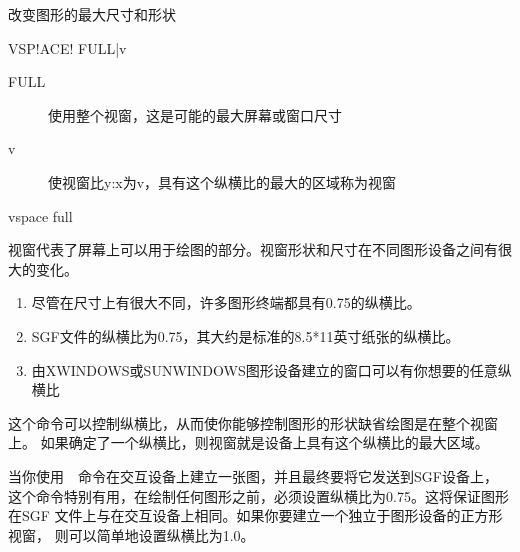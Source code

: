 \label{cmd:vspace}

改变图形的最大尺寸和形状

\begin{SACSTX}
VSP!ACE! FULL|v
\end{SACSTX}

\begin{description}
\item [FULL] 使用整个视窗，这是可能的最大屏幕或窗口尺寸
\item [v] 使视窗比y:x为v，具有这个纵横比的最大的区域称为视窗
\end{description}

\begin{SACDFT}
vspace full
\end{SACDFT}

视窗代表了屏幕上可以用于绘图的部分。视窗形状和尺寸在不同图形设备之间有很大的变化。
\begin{enumerate}
\item 尽管在尺寸上有很大不同，许多图形终端都具有0.75的纵横比。
\item SGF文件的纵横比为0.75，其大约是标准的8.5*11英寸纸张的纵横比。
\item  由XWINDOWS或SUNWINDOWS图形设备建立的窗口可以有你想要的任意纵横比
\end{enumerate}

这个命令可以控制纵横比，从而使你能够控制图形的形状缺省绘图是在整个视窗上。
如果确定了一个纵横比，则视窗就是设备上具有这个纵横比的最大区域。

当你使用~~命令在交互设备上建立一张图，并且最终要将它发送到SGF设备上，
这个命令特别有用，在绘制任何图形之前，必须设置纵横比为0.75。这将保证图形在SGF
文件上与在交互设备上相同。如果你要建立一个独立于图形设备的正方形视窗，
则可以简单地设置纵横比为1.0。
